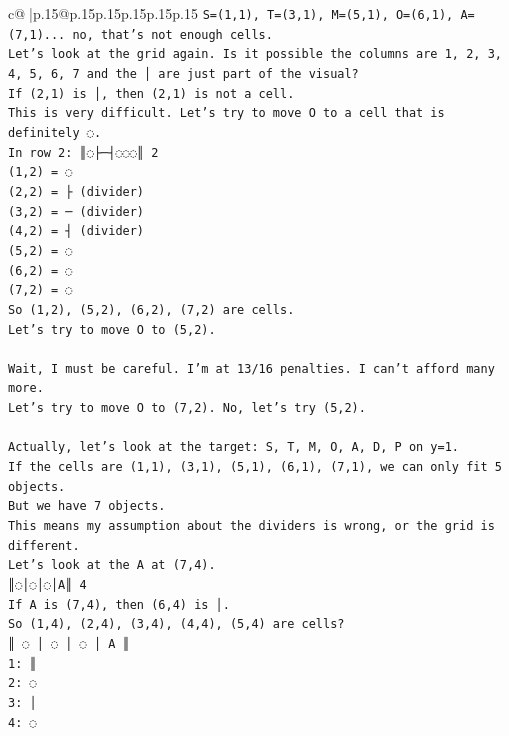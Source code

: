 \documentclass{article}
\begin{document}
{\begin{supertabular}{c@{$\;$}|p{.15\linewidth}@{}p{.15\linewidth}p{.15\linewidth}p{.15\linewidth}p{.15\linewidth}p{.15\linewidth}}
{{{\texttt{S=(1,1), T=(3,1), M=(5,1), O=(6,1), A=(7,1)... no, that's not enough cells.} \\
\texttt{Let's look at the grid again. Is it possible the columns are 1, 2, 3, 4, 5, 6, 7 and the │ are just part of the visual?} \\
\texttt{If (2,1) is │, then (2,1) is not a cell.} \\
\texttt{This is very difficult. Let's try to move O to a cell that is definitely ◌.} \\
\texttt{In row 2: ║◌├─┤◌◌◌║ 2} \\
\texttt{(1,2) = ◌} \\
\texttt{(2,2) = ├ (divider)} \\
\texttt{(3,2) = ─ (divider)} \\
\texttt{(4,2) = ┤ (divider)} \\
\texttt{(5,2) = ◌} \\
\texttt{(6,2) = ◌} \\
\texttt{(7,2) = ◌} \\
\texttt{So (1,2), (5,2), (6,2), (7,2) are cells.} \\
\texttt{Let's try to move O to (5,2).} \\
\\ 
\texttt{Wait, I must be careful. I'm at 13/16 penalties. I can't afford many more.} \\
\texttt{Let's try to move O to (7,2). No, let's try (5,2).} \\
\\ 
\texttt{Actually, let's look at the target: S, T, M, O, A, D, P on y=1.} \\
\texttt{If the cells are (1,1), (3,1), (5,1), (6,1), (7,1), we can only fit 5 objects.} \\
\texttt{But we have 7 objects.} \\
\texttt{This means my assumption about the dividers is wrong, or the grid is different.} \\
\texttt{Let's look at the A at (7,4).} \\
\texttt{║◌│◌│◌│A║ 4} \\
\texttt{If A is (7,4), then (6,4) is │.} \\
\texttt{So (1,4), (2,4), (3,4), (4,4), (5,4) are cells?} \\
\texttt{║ ◌ │ ◌ │ ◌ │ A ║} \\
\texttt{1: ║} \\
\texttt{2: ◌} \\
\texttt{3: │} \\
\texttt{4: ◌} \\
}}}
\end{supertabular}}
\end{document}
